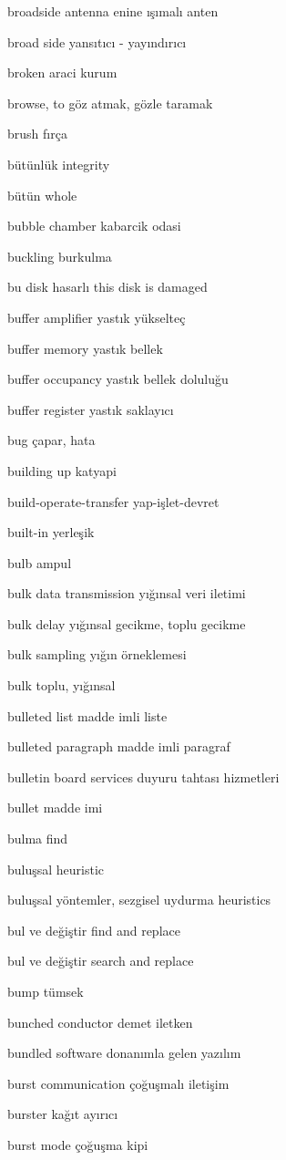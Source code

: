 \documentclass[12pt,fleqn]{article}\usepackage{../../common}
\begin{document}
broadside antenna enine ışımalı anten

broad side yansıtıcı - yayındırıcı

broken araci kurum

browse, to göz atmak, gözle taramak

brush fırça

bütünlük integrity

bütün whole

bubble chamber kabarcik odasi

buckling burkulma

bu disk hasarlı this disk is damaged

buffer amplifier yastık yükselteç

buffer memory yastık bellek

buffer occupancy yastık bellek doluluğu

buffer register yastık saklayıcı

bug çapar, hata

building up katyapi

build-operate-transfer yap-işlet-devret

built-in yerleşik

bulb ampul

bulk data transmission yığınsal veri iletimi

bulk delay yığınsal gecikme, toplu gecikme

bulk sampling yığın örneklemesi

bulk toplu, yığınsal

bulleted list madde imli liste

bulleted paragraph madde imli paragraf

bulletin board services duyuru tahtası hizmetleri

bullet madde imi

bulma find

buluşsal heuristic

buluşsal yöntemler, sezgisel uydurma heuristics

bul ve değiştir find and replace

bul ve değiştir search and replace

bump tümsek

bunched conductor demet iletken

bundled software donanımla gelen yazılım

burst communication çoğuşmalı iletişim

burster kağıt ayırıcı

burst mode çoğuşma kipi
\end{document}
